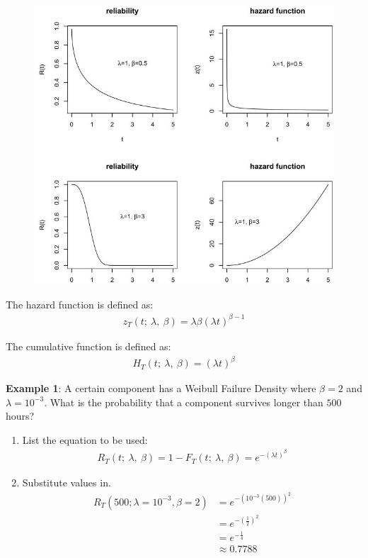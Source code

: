 \documentclass[10pt,a4paper]{article}
\begin{document}
\begin{figure} [h!]
    \centering
    \includegraphics[scale=0.7]{weibull.JPG}
\end{figure}

The hazard function is defined as:
\begin{align*}
    z_T(t;\: \lambda, \: \beta) = \lambda \beta (\lambda t)^{\beta -1}
\end{align*}

The cumulative function is defined as:
\begin{align*}
    H_T(t;\: \lambda, \: \beta) = (\lambda t)^\beta
\end{align*}

\pagebreak

\textbf{Example 1}: A certain component has a Weibull Failure Density where $\beta = 2$ and $\lambda
= 10^{-3}$. What is the probability that a component survives longer than $500$ hours?
\begin{enumerate}
    \item List the equation to be used: 
    \begin{align*}
        R_T(t;\: \lambda, \: \beta) = 1 - F_T(t;\: \lambda, \: \beta) = e^{-(\lambda t)^\beta}
    \end{align*}
    \item Substitute values in.
    \begin{align*}
        R_T(500; \lambda = 10^{-3}, \beta = 2) &= e^{-(10^{-3}(500))^2} \\
        &= e^{-\left(\frac{1}{2}\right)^2} \\
        &= e^{-\frac{1}{4}} \\
        &\approx 0.7788 
    \end{align*}
\end{enumerate}
\end{document}

